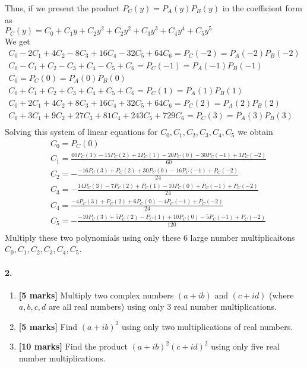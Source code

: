 \documentclass[a4paper]{scrartcl}
\begin{document}
Thus, if we present the product $P_C(y)=P_A(y)P_B(y)$ in the coefficient form as\\
$P_C(y) = C_0 +C_1 y +C_2 y^2 +C_2 y^2 +C_3 y^3 +C_4 y^4 +C_5 y^5 
$\\
We get
\begin{align*}
C_0 - 2C_1 + 4 C_2 - 8  C_3 + 16 C_4 - 32  C_5 + 64  C_6 = P_C(-2) = P_A(-2)P_B(-2)\\
C_0 -  C_1 +   C_2 -    C_3 +    C_4 -     C_5 +     C_6 = P_C(-1) = P_A(-1)P_B(-1)\\
C_0 =  P_C(0)  = P_A(0)P_B(0)\\
C_0 +  C_1 +   C_2 +    C_3 + C_4    +     C_5 +     C_6 =  P_C(1) = P_A(1)P_B(1) \\
C_0 + 2C_1 + 4 C_2 + 8  C_3 + 16C_4  + 32  C_5 + 64  C_6 =  P_C(2) = P_A(2)P_B(2) \\
C_0 + 3C_1 + 9 C_2 + 27 C_3 + 81 C_4 + 243 C_5 + 729 C_6 =  P_C(3) = P_A(3)P_B(3) \\
\end{align*}
Solving this system of linear equations for $C_0, C_1, C_2, C_3, C_4, C_5$ we obtain
\begin{align*}
&\
C_0 =  P_C(0) \\ &\
C_1 = \frac{60P_C(3)-15P_C(2)+2P_C(1)-20P_C(0)-30P_C(-1)+3P_C(-2)}{60}\\ &\
C_2 = -\frac{-16P_C(3)+P_C(2)+30P_C(0)-16P_C(-1)+P_C(-2)}{24}\\ &\
C_3 = -\frac{14P_C(3)-7P_C(2)+P_C(1)-10P_C(0)+P_C(-1)+P_C(-2)}{24}\\ &\
C_4 = \frac{-4P_C(3)+P_C(2)+6P_C(0)-4P_C(-1)+P_C(-2)}{24}\\ &\
C_5 = -\frac{-10P_C(3)+5P_C(2)-P_C(1)+10P_C(0)-5P_C(-1)+P_C(-2)}{120}\\ &\
\end{align*}
Multiply these two polynomials using only these 6 large number multiplicaitons $C_0, C_1, C_2, C_3, C_4, C_5$.
\paragraph{2.}
\label{sec:Question 2}
\begin{enumerate}[label=(\alph*)]
  \item {\bfseries[5 marks]} Multiply two complex numbers $(a + ib)$ and $(c + id)$ (where $a, b, c, d$ are all real numbers) using only 3 real number multiplications.
  \item {\bfseries[5 marks]} Find $(a + ib)^2$ using only two multiplications of real numbers.
  \item {\bfseries[10 marks]} Find the product $(a + ib)^2(c + id)^2$ using only five real number multiplications.
\end{enumerate}
\end{document}
